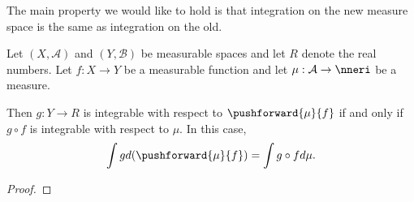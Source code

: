 The main property
we would like to hold
is that integration
on the new measure space
is the same as integration
on the old.

\begin{prop}
  Let
  $(X, \mathcal{A})$
  and
  $(Y, \mathcal{B})$
  be measurable spaces
  and let $R$ denote
  the real numbers.
  Let $f: X \to Y$ be
  a measurable function
  and let
  $\mu: \mathcal{A} \to \nneri$
  be a measure.

  Then $g: Y \to R$
  is integrable with
  respect to
  $\pushforward{\mu}{f}$
  if and only if
  $g \circ f$
  is integrable with
  respect to
  $\mu$.
  In this case,
  \[
    \int g d(\pushforward{\mu}{f})
    =
    \int g \circ f d\mu.
  \]
  \begin{proof}
  \end{proof}
\end{prop}
\strats
